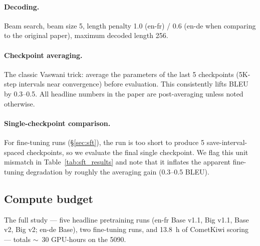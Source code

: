 \paragraph{Decoding.} Beam search, beam size 5, length penalty 1.0 (en-fr) / 0.6 (en-de when comparing to the original paper), maximum decoded length 256.

\paragraph{Checkpoint averaging.} The classic Vaswani trick: average the parameters of the last 5 checkpoints (5K-step intervals near convergence) before evaluation. This consistently lifts BLEU by 0.3--0.5. All headline numbers in the paper are post-averaging unless noted otherwise.

\paragraph{Single-checkpoint comparison.} For fine-tuning runs (\S\ref{sec:sft}), the run is too short to produce 5 save-interval-spaced checkpoints, so we evaluate the final single checkpoint. We flag this unit mismatch in Table~\ref{tab:sft_results} and note that it inflates the apparent fine-tuning degradation by roughly the averaging gain (0.3--0.5 BLEU).

\subsection{Compute budget}
The full study --- five headline pretraining runs (en-fr Base v1.1, Big v1.1, Base v2, Big v2; en-de Base), two fine-tuning runs, and 13.8~h of CometKiwi scoring --- totals $\sim$~30 GPU-hours on the 5090.
